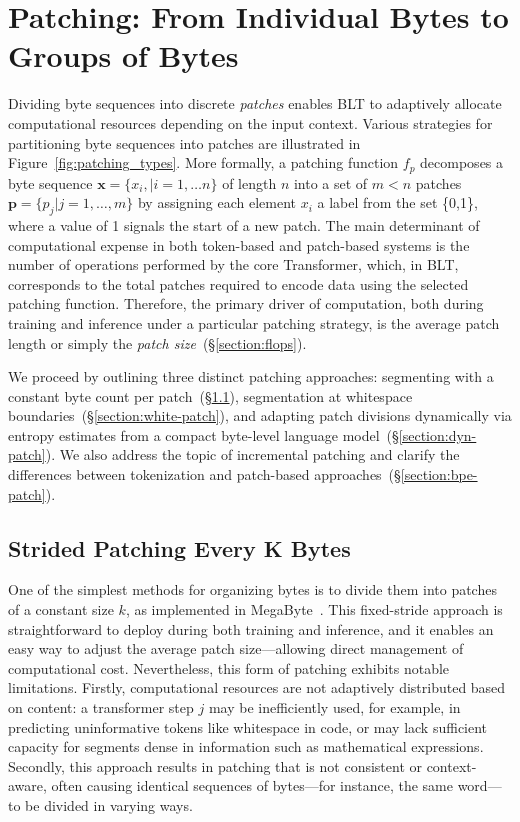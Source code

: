 \section{Patching: From Individual Bytes to Groups of Bytes}
\label{section:patching}

Dividing byte sequences into discrete \textit{patches} enables {\textsc BLT} to adaptively allocate computational resources depending on the input context. Various strategies for partitioning byte sequences into patches are illustrated in Figure~\ref{fig:patching_types}. More formally, a patching function $f_p$ decomposes a byte sequence $\pmb{x}=\{x_i,|i=1,\ldots n\}$ of length $n$ into a set of $m < n$ patches $\pmb{p}=\{p_j|j=1,\ldots,m\}$ by assigning each element $x_i$ a label from the set \{0,1\}, where a value of 1 signals the start of a new patch. The main determinant of computational expense in both token-based and patch-based systems is the number of operations performed by the core Transformer, which, in {\textsc BLT}, corresponds to the total patches required to encode data using the selected patching function. Therefore, the primary driver of computation, both during training and inference under a particular patching strategy, is the average patch length or simply the \textit{patch size}~(\S\ref{section:flops}).

We proceed by outlining three distinct patching approaches: segmenting with a constant byte count per patch~(\S\ref{section:static-patch}), segmentation at whitespace boundaries~(\S\ref{section:white-patch}), and adapting patch divisions dynamically via entropy estimates from a compact byte-level language model~(\S\ref{section:dyn-patch}). We also address the topic of incremental patching and clarify the differences between tokenization and patch-based approaches~(\S\ref{section:bpe-patch}).

\subsection{Strided Patching Every K Bytes}
\label{section:static-patch}

One of the simplest methods for organizing bytes is to divide them into patches of a constant size $k$, as implemented in MegaByte~\citep{yu2023megabyte}. This fixed-stride approach is straightforward to deploy during both training and inference, and it enables an easy way to adjust the average patch size—allowing direct management of computational cost. Nevertheless, this form of patching exhibits notable limitations. Firstly, computational resources are not adaptively distributed based on content: a transformer step $j$ may be inefficiently used, for example, in predicting uninformative tokens like whitespace in code, or may lack sufficient capacity for segments dense in information such as mathematical expressions. Secondly, this approach results in patching that is not consistent or context-aware, often causing identical sequences of bytes—for instance, the same word—to be divided in varying ways.

